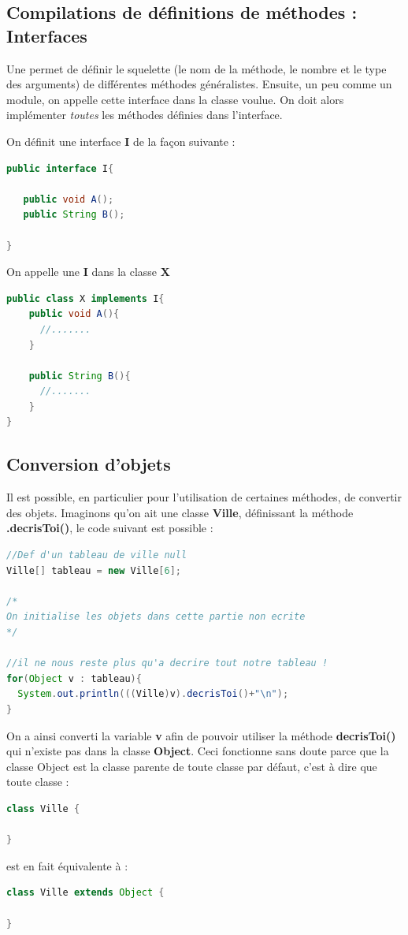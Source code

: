 \documentclass[a4paper,twoside]{article}
\begin{document}
\subsection{Compilations de définitions de méthodes : Interfaces}\label{sec:interface}
Une  permet de définir le squelette (le nom de la méthode, le nombre et le type des arguments) de différentes méthodes généralistes. Ensuite, un peu comme un module, on appelle cette interface dans la classe voulue. On doit alors implémenter \textit{toutes} les méthodes définies dans l'interface.

On définit une interface \textbf{I} de la façon suivante :
\begin{lstlisting}[language=java]
public interface I{
 
   public void A();
   public String B();
 
}
\end{lstlisting}

On appelle une  \textbf{I} dans la classe \textbf{X}
\begin{lstlisting}[language=java]
public class X implements I{
    public void A(){
      //.......
    }
 
    public String B(){
      //.......
    }
}
\end{lstlisting}

\subsection{Conversion d'objets}
Il est possible, en particulier pour l'utilisation de certaines méthodes, de convertir des objets. Imaginons qu'on ait une classe \textbf{Ville}, définissant la méthode \textbf{.decrisToi()}, le code suivant est possible :
\begin{lstlisting}[language=java]
//Def d'un tableau de ville null
Ville[] tableau = new Ville[6];

/*
On initialise les objets dans cette partie non ecrite
*/

//il ne nous reste plus qu'a decrire tout notre tableau !
for(Object v : tableau){
  System.out.println(((Ville)v).decrisToi()+"\n");
}
\end{lstlisting}
On a ainsi converti la variable \textbf{v} afin de pouvoir utiliser la méthode \textbf{decrisToi()} qui n'existe pas dans la classe \textbf{Object}. Ceci fonctionne sans doute parce que la classe Object est la classe parente de toute classe par défaut, c'est à dire que toute classe :
\begin{lstlisting}[language=java]
class Ville {

}
\end{lstlisting}
est en fait équivalente à :
\begin{lstlisting}[language=java]
class Ville extends Object {

}
\end{lstlisting}
\end{document}
